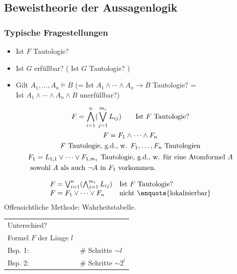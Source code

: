 \subsection{Beweistheorie der Aussagenlogik}
\subsubsection{Typische Fragestellungen}
\begin{itemize}
	\item Ist $F$ Tautologie?
	\item Ist $G$ erfüllbar? \qquad ( Ist $G$ Tautologie? )
	\item Gilt $A_1 , \dotsc , A_n \models B$ \quad (= Ist $A_1 \wedge \dotsb \wedge A_n \rightarrow B$ Tautologie? = \\
		Ist $A_1 \wedge \dotsb \wedge A_n \wedge B$ unerfüllbar?)
\end{itemize}
\begin{bsp}
	\begin{gather*}
		F = \bigwedge_{i=1}^n ( \bigvee_{j=1}^{m_i} L_{ij} ) \qquad \text{Ist } F \text{ Tautologie?} \\
		F = F_1 \wedge \dotsb \wedge F_n \\
		F \text{ Tautologie, g.d., w. } F_1 , \dotsc , F_n \text{ Tautologien} \\
		\begin{split}
			& F_1 = L_{1,1} \vee \dotsb \vee F_{1,m_1} \text{ Tautologie, g.d., w. für eine Atomformel } A \\
			& \text{ sowohl } A \text{ als auch } \neg A \text{ in } F_1 \text{ vorkommen.}
		\end{split}
	\end{gather*}
\end{bsp}
\begin{bsp}
	\begin{gather*}
		\begin{array}{ l l }
			F = \bigvee_{i=1}^n ( \bigwedge_{j=1}^{m_i} L_{ij} )		& \text{Ist } F \text{ Tautologie?} \\
			F = F_1 \vee \dotsb \vee F_n					& \text{nicht \enquote{lokalisierbar}}
		\end{array}
	\end{gather*}
	Offensichtliche Methode: Wahrheitstabelle. \\
	\begin{tabular}{ l l}
		Unterschied? \\
		Formel $F$ der Länge $l$			\\
		Bsp. 1: 	& \# Schritte $\sim l$		\\
		Bsp. 2: 	& \# Schritte $\sim 2^l$
	\end{tabular}
\end{bsp}


